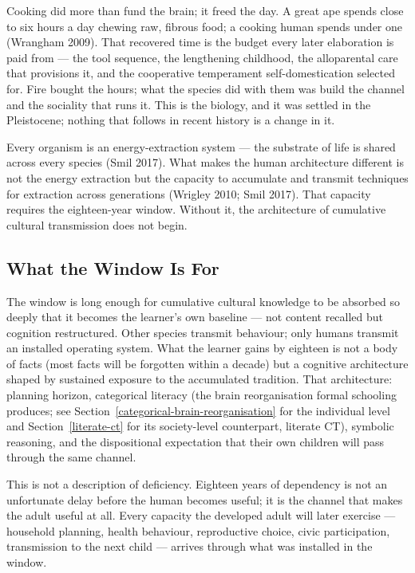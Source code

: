 \documentclass[12pt,letterpaper]{article}
\begin{document}
Cooking did more than fund the brain; it freed the day. A great ape
spends close to six hours a day chewing raw, fibrous food; a cooking
human spends under one (Wrangham 2009). That recovered time is the
budget every later elaboration is paid from --- the tool sequence, the
lengthening childhood, the alloparental care that provisions it, and
the cooperative temperament self-domestication selected for. Fire
bought the hours; what the species did with them was build the channel
and the sociality that runs it. This is the biology, and it was settled
in the Pleistocene; nothing that follows in recent history is a change
in it.

Every organism is an energy-extraction system --- the substrate of
life is shared across every species (Smil 2017). What makes the
human architecture different is not the energy extraction but the
capacity to accumulate and transmit techniques for extraction across
generations (Wrigley 2010; Smil 2017). That capacity requires the
eighteen-year window. Without it, the architecture of cumulative
cultural transmission does not begin.

\subsection{What the Window Is For}\label{what-the-window-is-for}

The window is long enough for cumulative cultural knowledge to be
absorbed so deeply that it becomes the learner's own baseline ---
not content recalled but cognition restructured. Other species
transmit behaviour; only humans transmit an installed operating
system. What the learner gains by eighteen is not a body of facts
(most facts will be forgotten within a decade) but a cognitive
architecture shaped by sustained exposure to the accumulated
tradition. That architecture: planning horizon, categorical literacy
(the brain reorganisation formal schooling produces; see
Section~\ref{categorical-brain-reorganisation} for the individual
level and Section~\ref{literate-ct} for its society-level
counterpart, literate CT), symbolic reasoning, and the dispositional
expectation that their own children will pass through the same
channel.

This is not a description of deficiency. Eighteen years of
dependency is not an unfortunate delay before the human becomes
useful; it is the channel that makes the adult useful at all. Every
capacity the developed adult will later exercise --- household
planning, health behaviour, reproductive choice, civic participation,
transmission to the next child --- arrives through what was installed
in the window.
\end{document}

